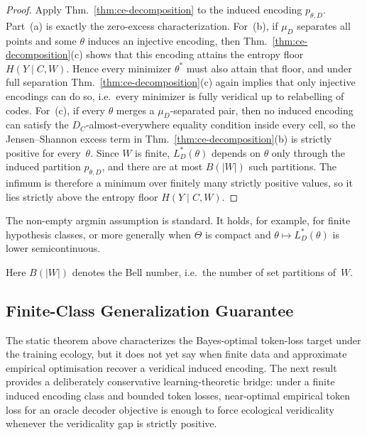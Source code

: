 \documentclass[twoside,11pt]{article}
\newcommand{\thmref}[1]{Thm.~\ref{#1}}
\begin{document}
\begin{proof}
Apply \thmref{thm:ce-decomposition} to the induced encoding $p_{\theta,D}$. Part~(a) is exactly the zero-excess characterization. For~(b), if $\mu_D$ separates all points and some $\theta$ induces an injective encoding, then \thmref{thm:ce-decomposition}(c) shows that this encoding attains the entropy floor $H(Y \mid C,W)$. Hence every minimizer $\theta^*$ must also attain that floor, and under full separation \thmref{thm:ce-decomposition}(c) again implies that only injective encodings can do so, i.e.\ every minimizer is fully veridical up to relabelling of codes. For~(c), if every $\theta$ merges a $\mu_D$-separated pair, then no induced encoding can satisfy the $D_C$-almost-everywhere equality condition inside every cell, so the Jensen--Shannon excess term in \thmref{thm:ce-decomposition}(b) is strictly positive for every~$\theta$. Since $W$ is finite, $L_D^*(\theta)$ depends on $\theta$ only through the induced partition $p_{\theta,D}$, and there are at most $B(|W|)$ such partitions. The infimum is therefore a minimum over finitely many strictly positive values, so it lies strictly above the entropy floor $H(Y \mid C,W)$.
\end{proof}

\begin{remark}
The non-empty argmin assumption is standard. It holds, for example, for finite hypothesis classes, or more generally when $\Theta$ is compact and $\theta \mapsto L_D^*(\theta)$ is lower semicontinuous.
\end{remark}

\begin{remark}
Here $B(|W|)$ denotes the Bell number, i.e.\ the number of set partitions of~$W$.
\end{remark}

\subsection{Finite-Class Generalization Guarantee}

The static theorem above characterizes the Bayes-optimal token-loss target under the training ecology, but it does not yet say when finite data and approximate empirical optimisation recover a veridical induced encoding. The next result provides a deliberately conservative learning-theoretic bridge: under a finite induced encoding class and bounded token losses, near-optimal empirical token loss for an oracle decoder objective is enough to force ecological veridicality whenever the veridicality gap is strictly positive.
\end{document}
